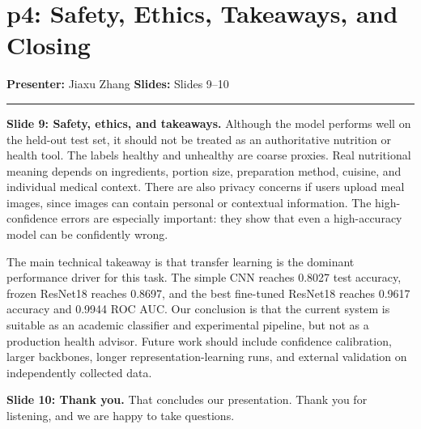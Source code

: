 \documentclass[11pt]{article}
\newcommand{\parthead}[4]{%
  \section*{\textcolor{BerkeleyBlue}{#1: #2}}%
  \noindent\textbf{Presenter:} #3 \hfill \textbf{Slides:} #4%
  \par\vspace{0.4em}\hrule\vspace{0.8em}
}
\begin{document}
\parthead{p4}{Safety, Ethics, Takeaways, and Closing}{Jiaxu Zhang}{Slides 9--10}

\textbf{Slide 9: Safety, ethics, and takeaways.}
Although the model performs well on the held-out test set, it should not be treated as an authoritative nutrition or health tool. The labels healthy and unhealthy are coarse proxies. Real nutritional meaning depends on ingredients, portion size, preparation method, cuisine, and individual medical context. There are also privacy concerns if users upload meal images, since images can contain personal or contextual information. The high-confidence errors are especially important: they show that even a high-accuracy model can be confidently wrong.

The main technical takeaway is that transfer learning is the dominant performance driver for this task. The simple CNN reaches 0.8027 test accuracy, frozen ResNet18 reaches 0.8697, and the best fine-tuned ResNet18 reaches 0.9617 accuracy and 0.9944 ROC AUC. Our conclusion is that the current system is suitable as an academic classifier and experimental pipeline, but not as a production health advisor. Future work should include confidence calibration, larger backbones, longer representation-learning runs, and external validation on independently collected data.

\textbf{Slide 10: Thank you.}
That concludes our presentation. Thank you for listening, and we are happy to take questions.
\end{document}
